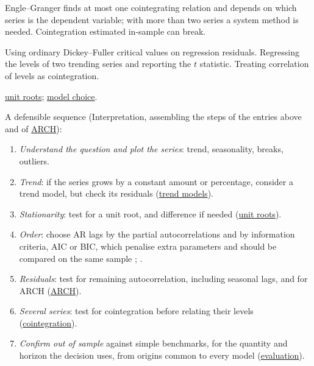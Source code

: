 \begin{qfmethod}
 Engle--Granger finds at most one cointegrating relation and depends on which series is the dependent variable; with more than two series a system method is needed. Cointegration estimated in-sample can break.

 Using ordinary Dickey--Fuller critical values on regression residuals. Regressing the levels of two trending series and reporting the $t$ statistic. Treating correlation of levels as cointegration.

 \hyperref[def:stationarity-unit-roots]{unit roots}; \hyperref[meth:time-series-model-selection]{model choice}.

\end{qfmethod}

\begin{qfmethod}\label{meth:time-series-model-selection}
 A defensible sequence (Interpretation, assembling the steps of the entries above and of \hyperref[mod:arch-conditional-variance]{ARCH}):
\begin{enumerate}
\item \emph{Understand the question and plot the series}: trend, seasonality, breaks, outliers.
\item \emph{Trend}: if the series grows by a constant amount or percentage, consider a trend model, but check its residuals (\hyperref[meth:trend-models]{trend models}).
\item \emph{Stationarity}: test for a unit root, and difference if needed (\hyperref[def:stationarity-unit-roots]{unit roots}).
\item \emph{Order}: choose AR lags by the partial autocorrelations and by information criteria, AIC or BIC, which penalise extra parameters and should be compared on the same sample \citep[pp.~46--47]{s7-tsay}; \citep[sec.~7.5]{s7-hyndman}.
\item \emph{Residuals}: test for remaining autocorrelation, including seasonal lags, and for ARCH (\hyperref[mod:arch-conditional-variance]{ARCH}).
\item \emph{Several series}: test for cointegration before relating their levels (\hyperref[meth:cointegration-testing]{cointegration}).
\item \emph{Confirm out of sample} against simple benchmarks, for the quantity and horizon the decision uses, from origins common to every model (\hyperref[meth:forecast-accuracy-evaluation]{evaluation}).
\end{enumerate}


\end{qfmethod}

